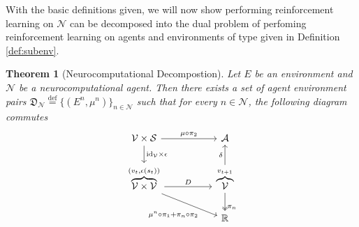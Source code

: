 \documentclass{article} %
\newtheorem{theorem}{Theorem}
\numberwithin{equation}{subsection}
\numberwithin{theorem}{subsection}
\def\reals{{\mathbb R}}
\def\defeq{\stackrel{\text{def}}{=}}
\theoremstyle{named}
\def\scriptv{{\mathcal V}}
\def\scripta{{\mathcal A}}
\def\scriptn{{\mathcal N}}
\def\scripts{{\mathcal S}}
\begin{document}
With the basic definitions given, we will now show performing reinforcement learning on $\scriptn$ can be decomposed into the dual problem of perfoming reinforcement learning on agents and environments of type given in Definition \ref{def:subenv}.

\begin{theorem}[Neurocomputational Decompostion]\label{thm:ncomp}
  Let $E$ be an environment and $\scriptn$ be a neurocomputational agent. Then there exists a set of agent environment pairs $\mathfrak{D}_\scriptn \defeq \{(E^n, \mu^n)\}_{n\in \scriptn}$ such that for every $n \in \scriptn$, the following diagram commutes
\begin{equation}\label{eq:sub_env_com}
          \begin{tikzcd} %
        \scriptv  \times \scripts \arrow{r}{\mu\circ\pi_2}
             \arrow{d}
               {\mathrm{id}_\scriptv\times\epsilon}  &[+25pt]  \scripta    \\
          \overbrace{\scriptv \times \scriptv}^{(v_{t},\epsilon(s_t))}
                      \arrow{r}{D}
                                  \arrow[pos = 0.7]{rd}[swap]{\mu^n\circ\pi_1 + \pi_n \circ \pi_2}
                      & \overbrace{\scriptv}^{v_{t+1}}
                                            \arrow[two heads, pos=0.8]
                                              {d}
                                              {\pi_n}
                                            \arrow{u}{\delta} \\
  &\reals
         \end{tikzcd}
    \end{equation}
\end{theorem}
\end{document}

